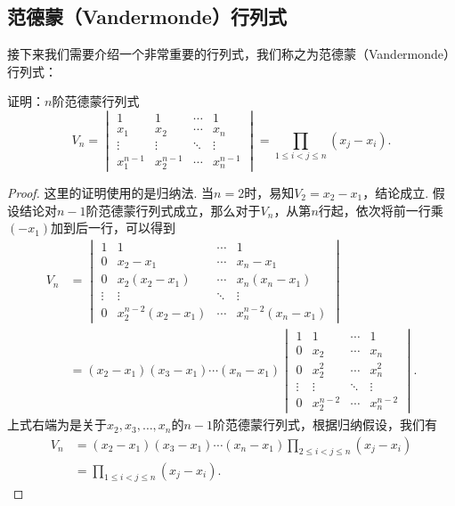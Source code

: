 \subsection{范德蒙（Vandermonde）行列式}
接下来我们需要介绍一个非常重要的行列式，我们称之为范德蒙（Vandermonde）行列式：
\begin{example}{}{}
    证明：$n$阶范德蒙行列式
    \[V_n=\begin{vmatrix}
            1         & 1         & \cdots & 1         \\
            x_1       & x_2       & \cdots & x_n       \\
            \vdots    & \vdots    & \ddots & \vdots    \\
            x_1^{n-1} & x_2^{n-1} & \cdots & x_n^{n-1}
        \end{vmatrix}=\prod_{1 \leqslant i < j \leqslant n}(x_j-x_i).\]
\end{example}

\begin{proof}
    这里的证明使用的是归纳法. 当$n=2$时，易知$V_2=x_2-x_1$，结论成立. 假设结论对$n-1$阶范德蒙行列式成立，那么对于$V_n$，从第$n$行起，依次将前一行乘$(-x_1)$加到后一行，可以得到\begin{align*}
        V_n & = \begin{vmatrix}
                    1      & 1                  & \cdots & 1                  \\
                    0      & x_2-x_1            & \cdots & x_n-x_1            \\
                    0      & x_2(x_2-x_1)       & \cdots & x_n(x_n-x_1)       \\
                    \vdots & \vdots             & \ddots & \vdots             \\
                    0      & x_2^{n-2}(x_2-x_1) & \cdots & x_n^{n-2}(x_n-x_1)
                \end{vmatrix} \\
            & = (x_2-x_1)(x_3-x_1)\cdots(x_n-x_1)
        \begin{vmatrix}
            1      & 1         & \cdots & 1         \\
            0      & x_2       & \cdots & x_n       \\
            0      & x_2^2     & \cdots & x_n^2     \\
            \vdots & \vdots    & \ddots & \vdots    \\
            0      & x_2^{n-2} & \cdots & x_n^{n-2}
        \end{vmatrix}.
    \end{align*}
    上式右端为是关于$x_2,x_3,\ldots,x_n$的$n-1$阶范德蒙行列式，根据归纳假设，我们有
    \begin{align*}
        V_n & = (x_2-x_1)(x_3-x_1)\cdots(x_n-x_1)\prod_{2 \leqslant i < j \leqslant n}(x_j-x_i) \\
            & = \prod_{1 \leqslant i < j \leqslant n}(x_j-x_i).
    \end{align*}
\end{proof}

